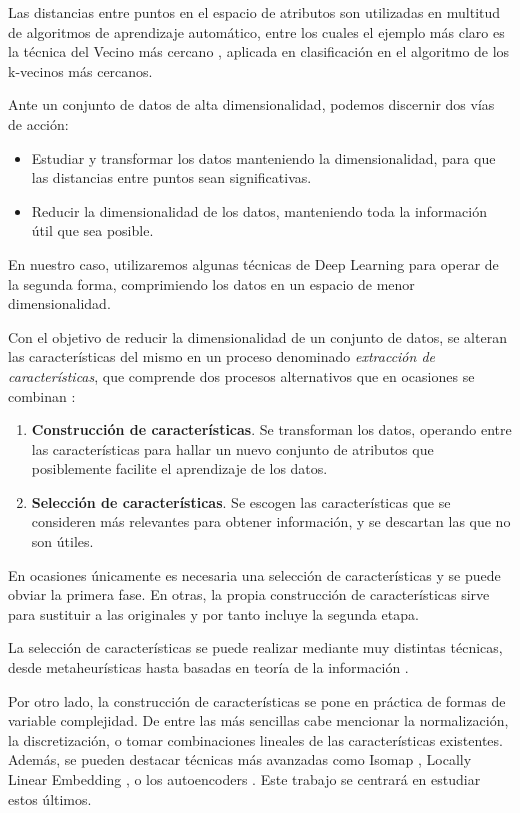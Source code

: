 Las distancias entre puntos en el espacio de atributos son utilizadas en
multitud de algoritmos de aprendizaje automático, entre los cuales el
ejemplo más claro es la técnica del Vecino más cercano
\autocite{peterson2009}, aplicada en clasificación en el algoritmo de los k-vecinos más cercanos.

Ante un conjunto de datos de alta
dimensionalidad, podemos discernir dos vías de acción:
\begin{itemize}
\tightlist
\item
  Estudiar y transformar los datos manteniendo la dimensionalidad, para
  que las distancias entre puntos sean significativas.
\item
  Reducir la dimensionalidad de los datos, manteniendo toda la
  información útil que sea posible.
\end{itemize}
En nuestro caso, utilizaremos algunas técnicas de Deep Learning para
operar de la segunda forma, comprimiendo los datos en un espacio de
menor dimensionalidad.

Con el objetivo de reducir la dimensionalidad de un conjunto de datos,
se alteran las características del mismo en un proceso denominado
\emph{extracción de características}, que comprende dos procesos alternativos que en ocasiones se combinan
\autocite{guyon2006}:

\begin{enumerate}
\def\labelenumi{\arabic{enumi}.}
\tightlist
\item
  \textbf{Construcción de características}. Se transforman los datos,
  operando entre las características para hallar un nuevo conjunto de
  atributos que posiblemente facilite el aprendizaje de los datos.
\item
  \textbf{Selección de características}. Se escogen las características
  que se consideren más relevantes para obtener información, y se
  descartan las que no son útiles.
\end{enumerate}

En ocasiones únicamente es necesaria una selección de características y
se puede obviar la primera fase. En otras, la propia construcción de
características sirve para sustituir a las originales y por tanto
incluye la segunda etapa.

La selección de características se puede realizar mediante muy distintas
técnicas, desde metaheurísticas hasta basadas en teoría de la
información \autocite{molina2002}.

Por otro lado, la construcción de características se pone en práctica de
formas de variable complejidad. De entre las más sencillas cabe
mencionar la normalización, la discretización, o tomar combinaciones
lineales de las características existentes. Además, se pueden destacar
técnicas más avanzadas como Isomap \autocite{tenenbaum2000}, Locally
Linear Embedding \autocite{roweis2000}, o los autoencoders
\autocite{hinton2006autoencoder}. Este trabajo se centrará en estudiar
estos últimos.

